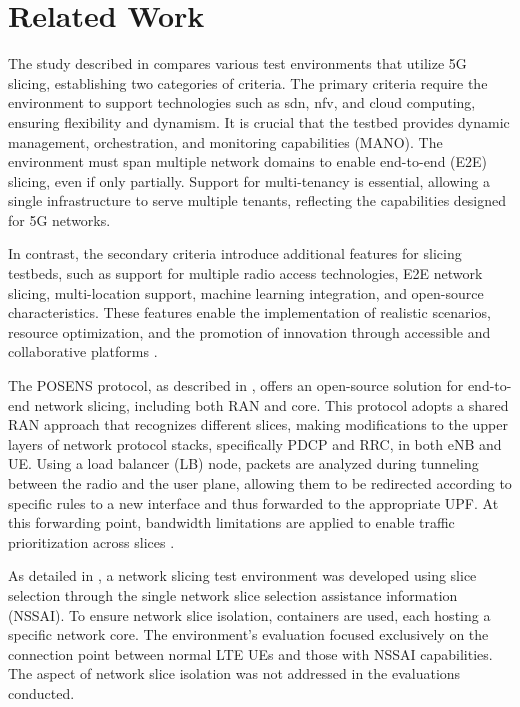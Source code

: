 \section{Related Work}
The study described in \cite{Esmaeily:2021} compares various test environments that utilize 5G slicing, establishing two categories of criteria. The primary criteria require the environment to support technologies such as \gls{sdn}, \gls{nfv}, and cloud computing, ensuring flexibility and dynamism. It is crucial that the testbed provides dynamic management, orchestration, and monitoring capabilities (MANO). The environment must span multiple network domains to enable end-to-end (E2E) slicing, even if only partially. Support for multi-tenancy is essential, allowing a single infrastructure to serve multiple tenants, reflecting the capabilities designed for 5G networks.

In contrast, the secondary criteria introduce additional features for slicing testbeds, such as support for multiple radio access technologies, E2E network slicing, multi-location support, machine learning integration, and open-source characteristics. These features enable the implementation of realistic scenarios, resource optimization, and the promotion of innovation through accessible and collaborative platforms \cite{Esmaeily:2021}.

The POSENS protocol, as described in \cite{GarciaAviles2018a}, offers an open-source solution for end-to-end network slicing, including both RAN and core. This protocol adopts a shared RAN approach that recognizes different slices, making modifications to the upper layers of network protocol stacks, specifically PDCP and RRC, in both eNB and UE. Using a load balancer (LB) node, packets are analyzed during tunneling between the radio and the user plane, allowing them to be redirected according to specific rules to a new interface and thus forwarded to the appropriate UPF. At this forwarding point, bandwidth limitations are applied to enable traffic prioritization across slices \cite{GarciaAviles2020b}.

As detailed in \cite{Shorov2019}, a network slicing test environment was developed using slice selection through the single network slice selection assistance information (NSSAI). To ensure network slice isolation, containers are used, each hosting a specific network core. The environment's evaluation focused exclusively on the connection point between normal LTE UEs and those with NSSAI capabilities. The aspect of network slice isolation was not addressed in the evaluations conducted.

